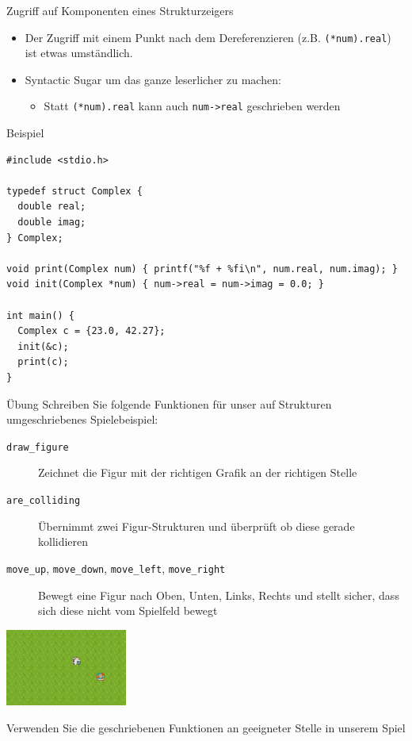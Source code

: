 \documentclass[presentation]{beamer}
\begin{document}
\begin{frame}[label={sec:orgcc97762},fragile]{Zugriff auf Komponenten eines Strukturzeigers}
 \begin{itemize}
\item Der Zugriff mit einem Punkt nach dem Dereferenzieren (z.B.
{\color{solarizedYellow}\texttt{(*num).real}}) ist etwas umständlich.
\item Syntactic Sugar um das ganze leserlicher zu machen:
\begin{itemize}
\item Statt {\color{solarizedYellow}\texttt{(*num).real} }kann auch {\color{solarizedYellow}\texttt{num->real} }geschrieben werden
\end{itemize}
\end{itemize}
\begin{exampleblock}{Beispiel}
\begin{verbatim}
#include <stdio.h>

typedef struct Complex {
  double real;
  double imag;
} Complex;

void print(Complex num) { printf("%f + %fi\n", num.real, num.imag); }
void init(Complex *num) { num->real = num->imag = 0.0; }

int main() {
  Complex c = {23.0, 42.27};
  init(&c);
  print(c);
}
\end{verbatim}
\end{exampleblock}
\end{frame}
\begin{frame}[label={sec:org6dc2091},fragile]{Übung}
 Schreiben Sie folgende Funktionen für unser auf Strukturen umgeschriebenes Spielebeispiel:
\begin{description}
\item[{{\color{solarizedYellow}\texttt{draw\_figure}}}] Zeichnet die Figur mit der richtigen Grafik an der richtigen Stelle
\item[{{\color{solarizedYellow}\texttt{are\_colliding}}}] Übernimmt zwei Figur-Strukturen und überprüft ob diese gerade kollidieren
\item[{{\color{solarizedYellow}\texttt{move\_up}}, {\color{solarizedYellow}\texttt{move\_down}}, {\color{solarizedYellow}\texttt{move\_left}}, {\color{solarizedYellow}\texttt{move\_right}}}] Bewegt eine
Figur nach Oben, Unten, Links, Rechts und stellt sicher, dass
sich diese nicht vom Spielfeld bewegt
\end{description}
\begin{center}\begin{center}
\includegraphics[width=0.3\textwidth]{data/06/33dede-9a84-458e-8ea0-5ae29bb9bc9c/screenshot-20200306-160024.png}
\end{center}\end{center}
Verwenden Sie die geschriebenen Funktionen an geeigneter Stelle in
unserem Spiel
\end{frame}
\end{document}
